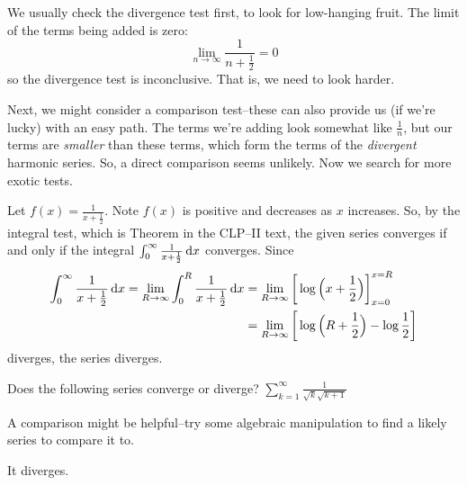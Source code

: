 \begin{solution}
We usually check the divergence test first, to look for low-hanging fruit. The limit of the terms being added is zero:
\[\lim_{n \to \infty}\frac{1}{n+\frac{1}{2}}=0\]
so the divergence test is inconclusive. That is, we need to look harder.

Next, we might consider a comparison test--these can also provide us (if we're lucky) with an easy path. The terms we're adding look somewhat like $\frac{1}{n}$, but our terms are \emph{smaller} than these terms, which form the terms of the \emph{divergent} harmonic series. So, a direct comparison seems unlikely. Now we search for more exotic tests.

Let $\displaystyle f(x) =\frac{1}{x+\frac{1}{2}}$.
Note $f(x)$ is positive and decreases as $x$ increases.
So, by the integral test, which is
Theorem  in the CLP--II text,
the given series converges if and only if the
integral $\int_0^\infty\frac{1}{x+\frac{1}{2}} \,\mathrm{d}x$ converges.
Since
\begin{align*}
\int_0^\infty \frac{1}{x+\frac{1}{2}} \,\mathrm{d}x =
\lim_{R\rightarrow\infty} \int_0^R\frac{1}{x+\frac{1}{2}} \,\mathrm{d}x
&=\lim_{R\rightarrow\infty} \bigg[ \log\Big(x+\frac{1}{2}\Big)\bigg]^{x=R}_{x=0} \\
&=\lim_{R\to\infty} \bigg[ \log\Big(R+\frac{1}{2}\Big) - \log\frac12 \bigg]
\end{align*}
diverges, the series diverges.
\end{solution}






\begin{Mquestion}
Does the following series converge or diverge?
$\displaystyle\sum_{k=1}^\infty\frac{1}{\sqrt{k}\sqrt{k+1}}$
\end{Mquestion}

\begin{hint}
A comparison might be helpful--try some algebraic manipulation to find a likely series to compare it to.
\end{hint}

\begin{answer}
It diverges.
\end{answer}


